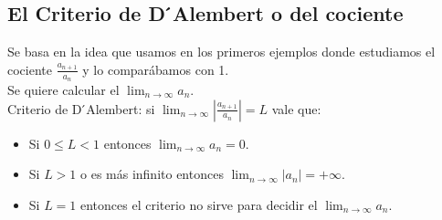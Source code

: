 \documentclass[../Teoría.root.tex]{subfiles}
\begin{document}
\subsection{El Criterio de D ́Alembert o del cociente}
Se basa en la idea que usamos en los primeros ejemplos donde estudiamos el cociente \(\frac{a_{n+1}}{a_n}\) y lo comparábamos con 1.\\
Se quiere calcular el \(\lim_{n\to\infty}a_n\).\\
Criterio de D ́Alembert: si \(\lim_{n\to\infty}\left|\frac{a_{n+1}}{a_n}\right|=L\) vale que:
\begin{itemize}
    \item Si \(0\leq L<1\) entonces \(\lim_{n\to\infty}a_n=0\).
    \item Si \(L>1\) o es más infinito entonces \(\lim_{n\to\infty}|a_n|=+\infty\).
    \item Si \(L=1\) entonces el criterio no sirve para decidir el \(\lim_{n\to\infty}a_n\).
\end{itemize}
\end{document}
